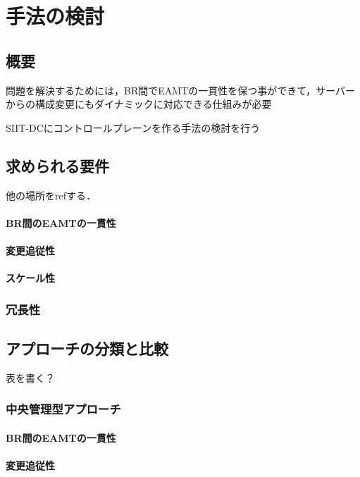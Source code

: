 \chapter{手法の検討}
\label{consideration}



\section{概要}
問題を解決するためには，BR間でEAMTの一貫性を保つ事ができて，サーバーからの構成変更にもダイナミックに対応できる仕組みが必要


SIIT-DCにコントロールプレーンを作る手法の検討を行う


\section{求められる要件}
他の場所をrefする．

\subsubsection{BR間のEAMTの一貫性}
\subsubsection{変更追従性}
\subsubsection{スケール性}
\subsection{冗長性}


\section{アプローチの分類と比較}
表を書く？

\subsection{中央管理型アプローチ}

\subsubsection{BR間のEAMTの一貫性}
\subsubsection{変更追従性}
